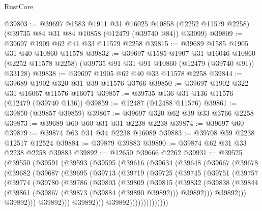 \begin{lexlean}{RustCore}
\begin{coremodule}
@39803 := @39697
    @1583
    @1911
    @31
    @16025
    @10858
    (@2252 @11579 @2258)
    (@39735 @84 @31 @84 @10858 (@12479 (@39740 @84)) @33099)
@39809 := @39697 @1909 @62 @41 @33 @11579 @2258
@39815 := @39689 @1585 @1905 @31 @40 @10860 @11578
@39832 := @39697
    @1585
    @1907
    @31
    @16046
    @10860
    (@2252 @11578 @2258)
    (@39735 @91 @31 @91 @10860 (@12479 (@39740 @91)) @33128)
@39838 := @39697 @1905 @62 @40 @33 @11578 @2258
@39844 := @39689 @1902 @320 @31 @39 @11576 @3766
@39850 := @39697 @1902 @322 @31 @16067 @11576 @16071
@39857 := @39735 @136 @31 @136 @11576 (@12479 (@39740 @136))
@39859 := @12487 (@12488 @11576)
@39861 := @39850 (@39857 @39859)
@39867 := @39697 @320 @62 @39 @33 @3766 @2258
@39873 := @39689 @60 @60 @31 @31 @2238 @2238
@39874 := @39697 @60
@39879 := @39874 @63 @31 @34 @2238 @16089
@39883 := @39708 @59 @2238 @12517 @12524
@39884 := @39879 @39883
@39890 := @39874 @62 @31 @33 @2238 @2258 @39883
@39892 := @12650 @39666 @2262
@39931 := @39525
    (@39550
      (@39591
        (@39593
          (@39595
            (@39616
              (@39634
                (@39648
                  (@39667
                    (@39678
                      (@39682
                        (@39687
                          (@39695
                            (@39713
                              (@39719
                                (@39725
                                  (@39745
                                    (@39751
                                      (@39757
                                        (@39774
                                          (@39780
                                            (@39786
                                              (@39803
                                                (@39809
                                                  (@39815
                                                    (@39832
                                                      (@39838
                                                        (@39844
                                                          (@39861
                                                            (@39867
                                                              (@39873 (@39884 (@39890 @39892)))
                                                              @39892)))
                                                        @39892)))
                                                  @39892)))
                                            @39892)))
                                      @39892)))
                                @39892))))))))))))))

\end{coremodule}
\end{lexlean}
